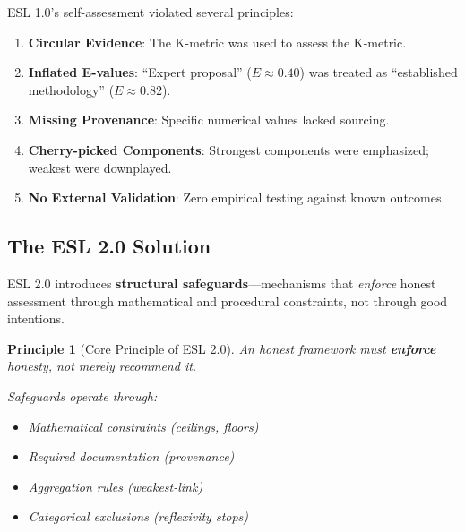 \documentclass[11pt,a4paper]{article}
\newtheorem{principle}{Principle}[section]
\theoremstyle{remark}
\begin{document}
ESL 1.0's self-assessment violated several principles:

\begin{enumerate}
    \item \textbf{Circular Evidence}: The K-metric was used to assess the K-metric.

    \item \textbf{Inflated E-values}: ``Expert proposal'' ($E \approx 0.40$) was treated as ``established methodology'' ($E \approx 0.82$).

    \item \textbf{Missing Provenance}: Specific numerical values lacked sourcing.

    \item \textbf{Cherry-picked Components}: Strongest components were emphasized; weakest were downplayed.

    \item \textbf{No External Validation}: Zero empirical testing against known outcomes.
\end{enumerate}

\subsection{The ESL 2.0 Solution}

ESL 2.0 introduces \textbf{structural safeguards}---mechanisms that \textit{enforce} honest assessment through mathematical and procedural constraints, not through good intentions.

\begin{principle}[Core Principle of ESL 2.0]
\label{princ:core}
\textit{An honest framework must \textbf{enforce} honesty, not merely recommend it.}

Safeguards operate through:
\begin{itemize}
    \item Mathematical constraints (ceilings, floors)
    \item Required documentation (provenance)
    \item Aggregation rules (weakest-link)
    \item Categorical exclusions (reflexivity stops)
\end{itemize}
\end{principle}

\end{document}
